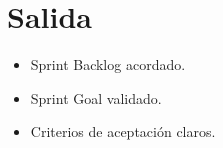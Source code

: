 \documentclass[12pt,a4paper]{article}
\begin{document}
\section{Salida}
\begin{itemize}[leftmargin=*]
    \item Sprint Backlog acordado.
    \item Sprint Goal validado.
    \item Criterios de aceptación claros.
\end{itemize}
\end{document}
